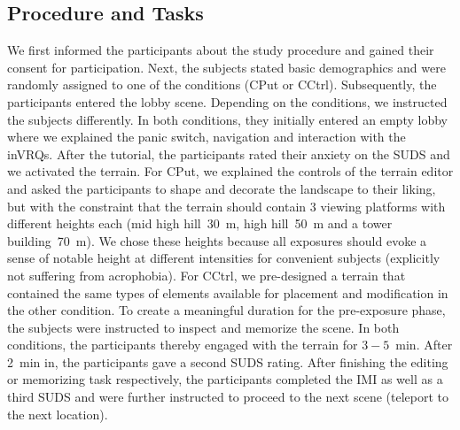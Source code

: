 


\subsection{Procedure and Tasks}
We first informed the participants about the study procedure and gained their consent for participation.
Next, the subjects stated basic demographics and were randomly assigned to one of the conditions (\acl{CPut} or \acl{CCtrl}).
Subsequently, the participants entered the lobby scene. Depending on the conditions, we instructed the subjects differently. In both conditions, they initially entered an empty lobby where we explained the panic switch, navigation and interaction with the inVRQs. After the tutorial, the participants rated their anxiety on the SUDS and we activated the terrain. For \acl{CPut}, we explained the controls of the terrain editor and asked the participants to shape and decorate the landscape to their liking, but with the constraint that the terrain should contain $3$ viewing platforms with different heights each (mid high hill~\SI{30}{\metre}, high hill~\SI{50}{\metre} and a tower building~\SI{70}{\metre}). We chose these heights because all exposures should evoke a sense of notable height at different intensities for convenient subjects (explicitly not suffering from acrophobia).
For \acl{CCtrl}, we pre-designed a terrain that contained the same types of elements available for placement and modification in the other condition. %
To create a meaningful duration for the pre-exposure phase, the subjects were instructed to inspect and memorize the scene. In both conditions, the participants thereby engaged with the terrain for $3{-}5$~\si{\minute}. After \SI{2}{\minute} in, the participants gave a second SUDS rating.
After finishing the editing or memorizing task respectively, the participants completed the IMI as well as a third SUDS and were further instructed to proceed to the next scene (teleport to the next location).

